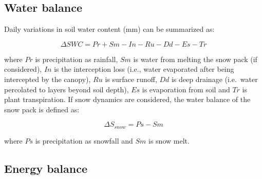 \documentclass[]{book}
\begin{document}
\hypertarget{water-balance-1}{%
\subsection{Water balance}\label{water-balance-1}}

Daily variations in soil water content (mm) can be summarized as:

\begin{equation}
\Delta{SWC} = Pr + Sm - In - Ru - Dd - Es -Tr
\end{equation}

where \(Pr\) is precipitation as rainfall, \(Sm\) is water from melting the snow pack (if considered), \(In\) is the interception loss (i.e., water evaporated after being intercepted by the canopy), \(Ru\) is surface runoff, \(Dd\) is deep drainage (i.e.~water percolated to layers beyond soil depth), \(Es\) is evaporation from soil and \(Tr\) is plant transpiration. If snow dynamics are considered, the water balance of the snow pack is defined as:

\begin{equation}
\Delta{S_{snow}} = Ps - Sm
\end{equation}

where \(Ps\) is precipitation as snowfall and \(Sm\) is snow melt.

\hypertarget{energy-balance}{%
\subsection{Energy balance}\label{energy-balance}}
\end{document}
